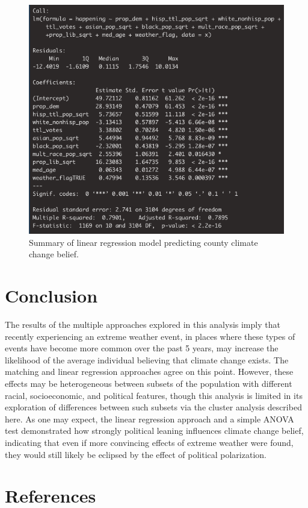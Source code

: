 \documentclass{article}
\begin{document}
\begin{figure}[H]
\centering
\includegraphics[scale=0.5]{images/regression_summary.png}
\caption{Summary of linear regression model predicting county climate change belief.}
\end{figure}


\section{Conclusion}
The results of the multiple approaches explored in this analysis imply that recently experiencing an extreme weather event, in places where these types of events have become more common over the past 5 years, may increase the likelihood of the average individual believing that climate change exists. The matching and linear regression approaches agree on this point. However, these effects may be heterogeneous between subsets of the population with different racial, socioeconomic, and political features, though this analysis is limited in its exploration of differences between such subsets via the cluster analysis described here. As one may expect, the linear regression approach and a simple ANOVA test demonstrated how strongly political leaning influences climate change belief, indicating that even if more convincing effects of extreme weather were found, they would still likely be eclipsed by the effect of political polarization. 

\newpage
\section{References}
\end{document}
